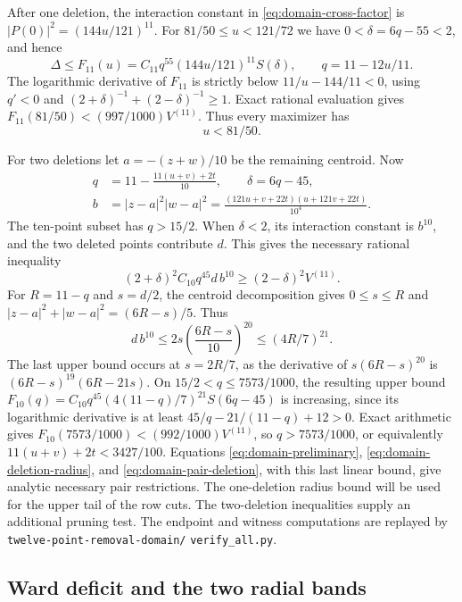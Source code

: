 \documentclass[11pt,letterpaper]{article}
\theoremstyle{remark}
\begin{document}
After one deletion, the interaction constant in
\eqref{eq:domain-cross-factor} is \(|P(0)|^2=(144u/121)^{11}\).
For \(81/50\le u<121/72\) we have \(0<\delta=6q-55<2\), and hence
\[
 \Delta\le F_{11}(u)=C_{11}q^{55}(144u/121)^{11}S(\delta),
 \qquad q=11-12u/11.
\]
The logarithmic derivative of \(F_{11}\) is strictly below
\(11/u-144/11<0\), using \(q'<0\) and
\((2+\delta)^{-1}+(2-\delta)^{-1}\ge1\). Exact rational evaluation gives
\(F_{11}(81/50)<(997/1000)V^{(11)}\). Thus every maximizer has
\begin{equation}
 u<81/50.
 \label{eq:domain-deletion-radius}
\end{equation}

For two deletions let \(a=-(z+w)/10\) be the remaining centroid. Now
\[
 \begin{aligned}
 q&=11-\frac{11(u+v)+2t}{10},\qquad \delta=6q-45,\\
 b&=|z-a|^2|w-a|^2=\frac{(121u+v+22t)(u+121v+22t)}{10^4}.
 \end{aligned}
\]
The ten-point subset has \(q>15/2\). When \(\delta<2\), its interaction
constant is \(b^{10}\), and the two deleted points contribute \(d\).
This gives the necessary rational inequality
\begin{equation}
 (2+\delta)^2 C_{10}q^{45}d\,b^{10}
 \ge (2-\delta)^2 V^{(11)}.
 \label{eq:domain-pair-deletion}
\end{equation}
For \(R=11-q\) and \(s=d/2\), the centroid decomposition gives
\(0\le s\le R\) and \(|z-a|^2+|w-a|^2=(6R-s)/5\). Thus
\[
 d\,b^{10}\le 2s\left(\frac{6R-s}{10}\right)^{20}
 \le (4R/7)^{21}.
\]
The last upper bound occurs at \(s=2R/7\), as the derivative of
\(s(6R-s)^{20}\) is \((6R-s)^{19}(6R-21s)\). On
\(15/2<q\le7573/1000\), the resulting upper bound
\(F_{10}(q)=C_{10}q^{45}(4(11-q)/7)^{21}S(6q-45)\) is increasing, since
its logarithmic derivative is at least \(45/q-21/(11-q)+12>0\).
Exact arithmetic gives \(F_{10}(7573/1000)<(992/1000)V^{(11)}\), so
\(q>7573/1000\), or equivalently \(11(u+v)+2t<3427/100\).
Equations \eqref{eq:domain-preliminary}, \eqref{eq:domain-deletion-radius},
and \eqref{eq:domain-pair-deletion}, with this last linear bound, give
analytic necessary pair restrictions. The one-deletion radius bound
will be used for the upper tail of the row cuts. The two-deletion
inequalities supply an additional pruning test. The endpoint and witness
computations are replayed by \texttt{twelve-point-removal-domain/}\allowbreak
\texttt{verify\_all.py}.

\subsection{Ward deficit and the two radial bands}
\end{document}

